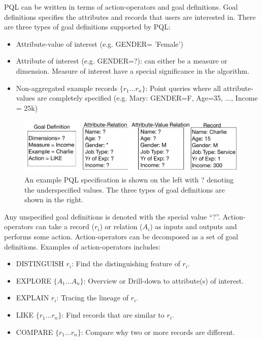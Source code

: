 \documentclass{sig-alternate-05-2015}
\begin{document}
\begin{enumerate}
\end{enumerate}
PQL can be written in terms of action-operators and goal definitions. Goal definitions specifies the attributes and records that users are interested in. There are three types of goal definitions supported by PQL: 
\begin{itemize}
	\item Attribute-value of interest (e.g. GENDER= 'Female')
	\item Attribute of interest (e.g. GENDER=?): can either be a measure or dimension. Measure of interest have a special significance in the algorithm.
	\item Non-aggregated example records $\{r_1 ...r_n\}$: Point queries where all attribute-values are completely specified (e.g. Mary: GENDER=F, Age=35, ..., Income = 25k)
\end{itemize}
\begin{figure}[ht!]\label{nodeType}
\includegraphics[width=\linewidth]{figures/nodeTypes.png}
\caption{An example PQL specification is shown on the left with ? denoting the underspecified values. The three types of goal definitions are shown in the right.}
\end{figure}
Any unspecified goal definitions is denoted with the special value ``?''. Action-operators can take a record ($r_i$) or relation ($A_i$) as inputs and outputs and performs some action. Action-operators can be decomposed as a set of goal definitions. Examples of action-operators includes:   
\begin{itemize}
  \item DISTINGUISH $r_i$: Find the distinguishing feature of $r_i$.
	\item EXPLORE $\{A_1 ...A_n\}$: Overview or Drill-down to attribute(s) of interest.
	\item EXPLAIN $r_i$: Tracing the lineage of $r_i$.
	\item LIKE $\{r_1 ...r_n\}$: Find records that are similar to $r_i$.
	\item COMPARE $\{r_1 ...r_n\}$: Compare why two or more records are different.
\end{itemize}
\end{document}
